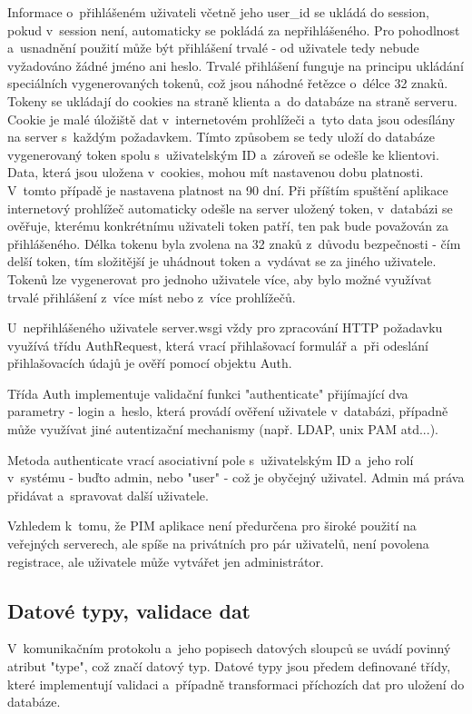 \documentclass[bc,male,html,dept460]{diploma}				%
\begin{document}
Informace o~přihlášeném uživateli včetně jeho user\_id se ukládá do session, pokud v~session není, automaticky se pokládá za nepřihlášeného. 
Pro pohodlnost a~usnadnění použití může být přihlášení trvalé - od uživatele tedy nebude vyžadováno žádné jméno ani heslo.
Trvalé přihlášení funguje na principu ukládání speciálních vygenerovaných tokenů, což jsou náhodné řetězce o~délce 32 znaků.
Tokeny se ukládají do cookies na straně klienta a~do databáze na straně serveru. Cookie je malé úložiště dat v~internetovém prohlížeči a~tyto data jsou odesílány na server s~každým požadavkem. Tímto způsobem se tedy uloží do databáze vygenerovaný token spolu s~uživatelským ID a~zároveň se odešle ke klientovi. Data, která jsou uložena v~cookies, mohou mít nastavenou dobu platnosti. V~tomto případě je nastavena platnost na 90 dní. Při příštím spuštění aplikace internetový prohlížeč automaticky odešle na server uložený token, v~databázi se ověřuje, kterému konkrétnímu uživateli token patří, ten pak bude považován za přihlášeného.
Délka tokenu byla zvolena na 32 znaků z~důvodu bezpečnosti - čím delší token, tím složitější je uhádnout token a~vydávat se za jiného uživatele.
Tokenů lze vygenerovat pro jednoho uživatele více, aby bylo možné využívat trvalé přihlášení z~více míst nebo z~více prohlížečů.

U~nepřihlášeného uživatele server.wsgi vždy pro zpracování HTTP požadavku využívá třídu AuthRequest, která vrací přihlašovací formulář a~při odeslání přihlašovacích údajů je ověří pomocí objektu Auth.

Třída Auth implementuje validační funkci "authenticate" přijímající dva parametry - login a~heslo, která provádí ověření uživatele v~databázi, případně může využívat jiné autentizační mechanismy (např. LDAP, unix PAM atd...). 

Metoda authenticate vrací asociativní pole s~uživatelským ID a~jeho rolí v~systému - buďto admin, nebo "user" - což je obyčejný uživatel.
Admin má práva přidávat a~spravovat další uživatele.

Vzhledem k~tomu, že PIM aplikace není předurčena pro široké použití na veřejných serverech, ale spíše na privátních pro pár uživatelů, není povolena registrace, ale uživatele může vytvářet jen administrátor.



\newpage
\subsection{Datové typy, validace dat}
\label{sec:dataTypes}
V~komunikačním protokolu a~jeho popisech datových sloupců se uvádí povinný atribut "type", což značí datový typ. Datové typy jsou předem definované třídy, které implementují validaci a~případně transformaci příchozích dat pro uložení do databáze.
\end{document}
